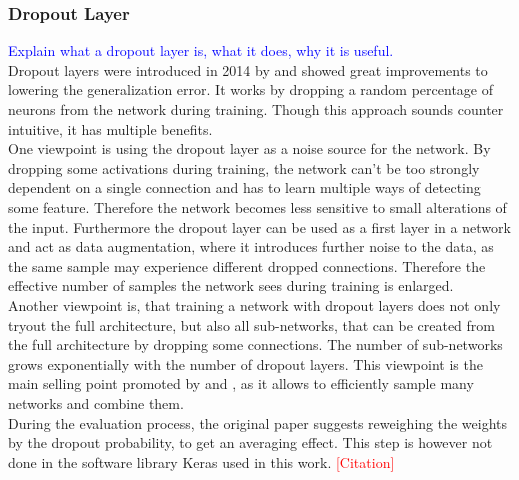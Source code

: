 \subsubsection{Dropout Layer}
\textcolor{blue}{Explain what a dropout layer is, what it does, why it is useful.}\\
Dropout layers were introduced in 2014 by \cite{dropout_invention} and showed great improvements to lowering the generalization error. It works by dropping a random percentage of neurons from the network during training. Though this approach sounds counter intuitive, it has multiple benefits.\\
One viewpoint is using the dropout layer as a noise source for the network. By dropping some activations during training, the network can't be too strongly dependent on a single connection and has to learn multiple ways of detecting some feature. Therefore the network becomes less sensitive to small alterations of the input. Furthermore the dropout layer can be used as a first layer in a network and act as data augmentation, where it introduces further noise to the data, as  the same sample may experience different dropped connections. Therefore the effective number of samples the network sees during training is enlarged.\\
Another viewpoint is, that training a network with dropout layers does not only tryout the full architecture, but also all sub-networks, that can be created from the full architecture by dropping some connections. The number of sub-networks grows exponentially with the number of dropout layers. This viewpoint is the main selling point promoted by \cite{deep_learning_book} and \cite{dropout_invention}, as it allows to efficiently sample many networks and combine them.\\
During the evaluation process, the original paper \cite{dropout_invention} suggests reweighing the weights by the dropout probability, to get an averaging effect. This step is however not done in the software library Keras used in this work. \textcolor{red}{[Citation]}
